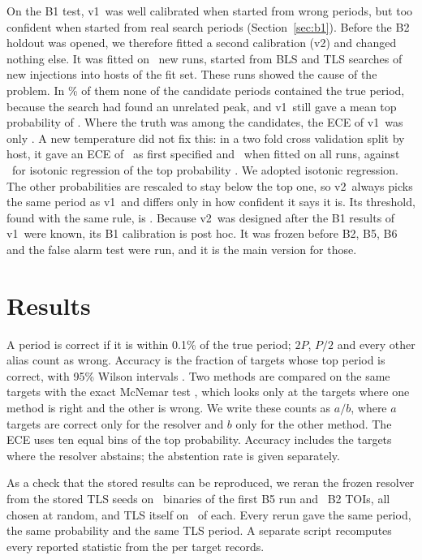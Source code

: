 \documentclass[twocolumn,linenumbers]{aastex701}
\newcommand{\Vone}{v1}
\newcommand{\Vtwo}{v2}
\begin{document}
On the B1 test, \Vone\ was well calibrated when started from wrong periods, but too confident when started from real search periods (Section~\ref{sec:b1}). Before the B2 holdout was opened, we therefore fitted a second calibration (\Vtwo) and changed nothing else. It was fitted on \vtwoCalRuns\ new runs, started from BLS and TLS searches of new injections into hosts of the fit set. These runs showed the cause of the problem. In \calTruthAbsentFrac\% of them none of the candidate periods contained the true period, because the search had found an unrelated peak, and \Vone\ still gave a mean top probability of \calTruthAbsentConf. Where the truth was among the candidates, the ECE of \Vone\ was only \calEceTruthIn. A new temperature did not fix this: in a two fold cross validation split by host, it gave an ECE of \cvEceTempTruth\ as first specified and \cvEceTempAll\ when fitted on all runs, against \cvEceIso\ for isotonic regression of the top probability \citep{Zadrozny2002}. We adopted isotonic regression. The other probabilities are rescaled to stay below the top one, so \Vtwo\ always picks the same period as \Vone\ and differs only in how confident it says it is. Its threshold, found with the same rule, is \thrVtwoLearned. Because \Vtwo\ was designed after the B1 results of \Vone\ were known, its B1 calibration is post hoc. It was frozen before B2, B5, B6 and the false alarm test were run, and it is the main version for those.

\section{Results} \label{sec:bench}

A period is correct if it is within 0.1\% of the true period; $2P$, $P/2$ and every other alias count as wrong. Accuracy is the fraction of targets whose top period is correct, with 95\% Wilson intervals \citep{Wilson1927}. Two methods are compared on the same targets with the exact McNemar test \citep{McNemar1947,Dietterich1998}, which looks only at the targets where one method is right and the other is wrong. We write these counts as $a/b$, where $a$ targets are correct only for the resolver and $b$ only for the other method. The ECE uses ten equal bins of the top probability. Accuracy includes the targets where the resolver abstains; the abstention rate is given separately.

As a check that the stored results can be reproduced, we reran the frozen resolver from the stored TLS seeds on \bFiveReproN\ binaries of the first B5 run and \bTwoReproN\ B2 TOIs, all chosen at random, and TLS itself on \bFiveReproTls\ of each. Every rerun gave the same period, the same probability and the same TLS period. A separate script recomputes every reported statistic from the per target records.
\end{document}
